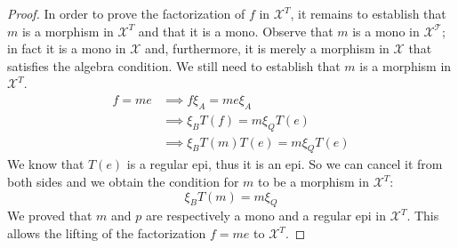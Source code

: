 \begin{subbox}{}
\begin{proof}
        In order to prove the factorization of $f$ in $\mathcal{X}^T$, it remains to establish that $m$ is a morphism in $\mathcal{X}^T$ and that it is a mono. Observe that $m$ is a mono in $\mathcal{X^T}$; in fact it is a mono in $\mathcal{X}$ and, furthermore, it is merely a morphism in $\mathcal{X}$ that satisfies the algebra condition. We still need to establish that $m$ is a morphism in $\mathcal{X}^T$.
        \begin{align*}
            f=me &\implies f \xi_A = me\xi_A \\[1.5ex]
            &\implies \xi_B T(f) = m \xi_Q T(e) \\[1.5ex]
            &\implies \xi_B T(m) T(e) =  m \xi_Q T(e)
        \end{align*}
        We know that $T(e)$ is a regular epi, thus it is an epi. So we can cancel it from both sides and we obtain the condition for $m$ to be a morphism in $\mathcal{X}^T$:
        \[ \xi_B T(m) =  m \xi_Q \]
        We proved that $m$ and $p$ are respectively a mono and a regular epi in $\mathcal{X}^T$. This allows the lifting of the factorization $f=me$ to $\mathcal{X}^T$.


\end{proof}
\end{subbox}
